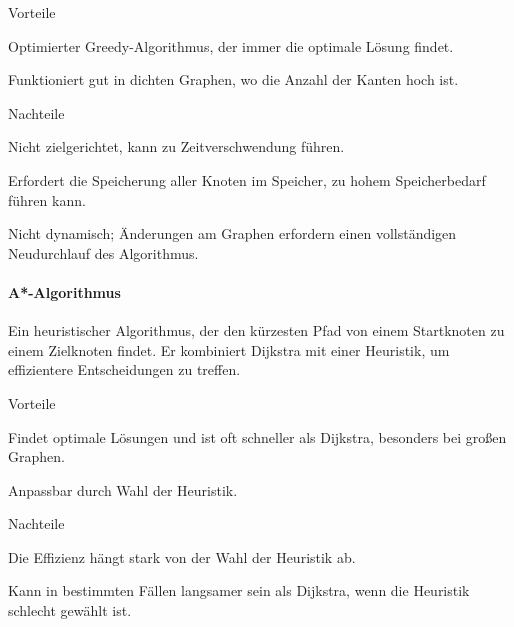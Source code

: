 \documentclass[../main.tex]{subfiles}
\begin{document}
\begin{minipage}[t]{0.48\textwidth}
\begin{items}
  \item [Vorteile]
  \item Optimierter Greedy-Algorithmus, der immer die optimale Lösung findet.
  \item Funktioniert gut in dichten Graphen, wo die Anzahl der Kanten hoch ist.
\end{items}
\end{minipage}
\hfill
\begin{minipage}[t]{0.48\textwidth}
\begin{items}
  \item [Nachteile]
  \item Nicht zielgerichtet, kann zu Zeitverschwendung führen.
  \item Erfordert die Speicherung aller Knoten im Speicher, zu hohem Speicherbedarf führen kann.
  \item Nicht dynamisch; Änderungen am Graphen erfordern einen vollständigen Neudurchlauf des Algorithmus.
\end{items}
\end{minipage}
\paragraph{A*-Algorithmus}

Ein heuristischer Algorithmus, der den kürzesten Pfad von einem Startknoten zu einem Zielknoten findet. Er kombiniert Dijkstra mit einer Heuristik, um effizientere Entscheidungen zu treffen.

\begin{minipage}[t]{0.48\textwidth}
\begin{items}
  \item [Vorteile]
  \item Findet optimale Lösungen und ist oft schneller als Dijkstra, besonders bei großen Graphen.
  \item Anpassbar durch Wahl der Heuristik.
\end{items}
\end{minipage}
\hfill
\begin{minipage}[t]{0.48\textwidth}
\begin{items}
  \item [Nachteile]
  \item Die Effizienz hängt stark von der Wahl der Heuristik ab.
  \item Kann in bestimmten Fällen langsamer sein als Dijkstra, wenn die Heuristik schlecht gewählt ist.
\end{items}
\end{minipage}
\end{document}
